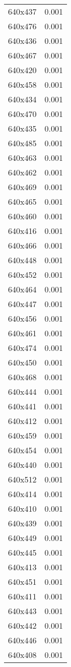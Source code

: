 \begin{table}
\begin{tabular}{lr}
640x437 & 0.001 \\
640x476 & 0.001 \\
640x436 & 0.001 \\
640x467 & 0.001 \\
640x420 & 0.001 \\
640x458 & 0.001 \\
640x434 & 0.001 \\
640x470 & 0.001 \\
640x435 & 0.001 \\
640x485 & 0.001 \\
640x463 & 0.001 \\
640x462 & 0.001 \\
640x469 & 0.001 \\
640x465 & 0.001 \\
640x460 & 0.001 \\
640x416 & 0.001 \\
640x466 & 0.001 \\
640x448 & 0.001 \\
640x452 & 0.001 \\
640x464 & 0.001 \\
640x447 & 0.001 \\
640x456 & 0.001 \\
640x461 & 0.001 \\
640x474 & 0.001 \\
640x450 & 0.001 \\
640x468 & 0.001 \\
640x444 & 0.001 \\
640x441 & 0.001 \\
640x412 & 0.001 \\
640x459 & 0.001 \\
640x454 & 0.001 \\
640x440 & 0.001 \\
640x512 & 0.001 \\
640x414 & 0.001 \\
640x410 & 0.001 \\
640x439 & 0.001 \\
640x449 & 0.001 \\
640x445 & 0.001 \\
640x413 & 0.001 \\
640x451 & 0.001 \\
640x411 & 0.001 \\
640x443 & 0.001 \\
640x442 & 0.001 \\
640x446 & 0.001 \\
640x408 & 0.001 \\

\end{tabular}
\end{table}
